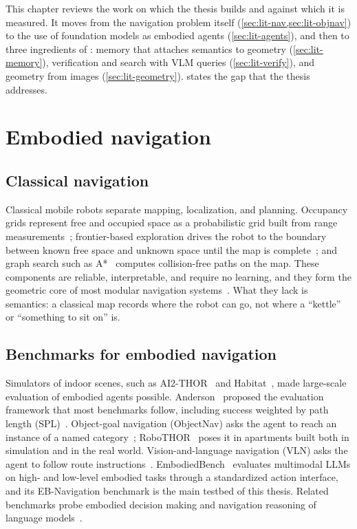 \label{chap:literature}
This chapter reviews the work on which the thesis builds and against which it is measured. It moves from the
navigation problem itself (\cref{sec:lit-nav,sec:lit-objnav}) to the use of foundation models as embodied agents
(\cref{sec:lit-agents}), and then to three ingredients of \ours: memory that attaches semantics to geometry
(\cref{sec:lit-memory}), verification and search with VLM queries (\cref{sec:lit-verify}), and geometry from images
(\cref{sec:lit-geometry}).  states the gap that the thesis addresses.

\section{Embodied navigation}
\label{sec:lit-nav}
\subsection{Classical navigation}
Classical mobile robots separate mapping, localization, and planning. Occupancy grids represent free and occupied
space as a probabilistic grid built from range measurements~\cite{elfes1989occupancy}; frontier-based exploration
drives the robot to the boundary between known free space and unknown space until the map is complete~\cite{yamauchi1997frontier};
and graph search such as A*~\cite{hart1968astar} computes collision-free paths on the map. These components are
reliable, interpretable, and require no learning, and they form the geometric core of most modular navigation
systems~\cite{thrun2005probabilistic}. What they lack is semantics: a classical map records where the robot can go,
not where a ``kettle'' or ``something to sit on'' is.

\subsection{Benchmarks for embodied navigation}
Simulators of indoor scenes, such as AI2-THOR~\cite{kolve2017ai2thor} and Habitat~\cite{savva2019habitat}, made
large-scale evaluation of embodied agents possible. Anderson~\etal{} proposed the evaluation framework that most
benchmarks follow, including success weighted by path length (SPL)~\cite{anderson2018evaluation}. Object-goal
navigation (ObjectNav) asks the agent to reach an instance of a named category~\cite{batra2020objectnav};
RoboTHOR~\cite{deitke2020robothor} poses it in apartments built both in simulation and in the real world.
Vision-and-language navigation (VLN) asks the agent to follow route instructions~\cite{anderson2018vln}.
EmbodiedBench~\cite{yang2025embodiedbench} evaluates multimodal LLMs on high- and low-level embodied tasks through a
standardized action interface, and its EB-Navigation benchmark is the main testbed of this thesis. Related benchmarks
probe embodied decision making and navigation reasoning of language models~\cite{li2024embodied,qiao2025navbench}.

